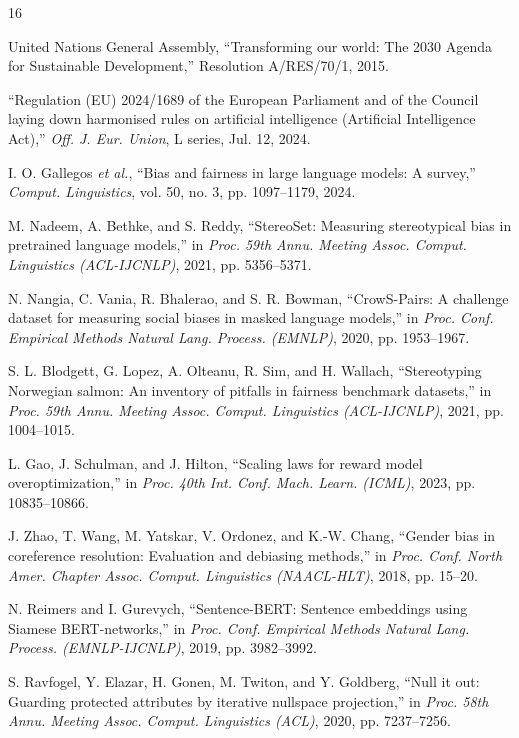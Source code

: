 \documentclass{IEEEcsmag}
\begin{document}
\begin{thebibliography}{16}

United Nations General Assembly, ``Transforming our world: The 2030 Agenda for Sustainable Development,'' Resolution A/RES/70/1, 2015.

``Regulation (EU) 2024/1689 of the European Parliament and of the Council laying down harmonised rules on artificial intelligence (Artificial Intelligence Act),'' {\it Off. J. Eur. Union}, L series, Jul. 12, 2024.

I. O. Gallegos {\it et al.}, ``Bias and fairness in large language models: A survey,'' {\it Comput. Linguistics}, vol. 50, no. 3, pp. 1097--1179, 2024.

M. Nadeem, A. Bethke, and S. Reddy, ``StereoSet: Measuring stereotypical bias in pretrained language models,'' in {\it Proc. 59th Annu. Meeting Assoc. Comput. Linguistics (ACL-IJCNLP)}, 2021, pp. 5356--5371.

N. Nangia, C. Vania, R. Bhalerao, and S. R. Bowman, ``CrowS-Pairs: A challenge dataset for measuring social biases in masked language models,'' in {\it Proc. Conf. Empirical Methods Natural Lang. Process. (EMNLP)}, 2020, pp. 1953--1967.

S. L. Blodgett, G. Lopez, A. Olteanu, R. Sim, and H. Wallach, ``Stereotyping Norwegian salmon: An inventory of pitfalls in fairness benchmark datasets,'' in {\it Proc. 59th Annu. Meeting Assoc. Comput. Linguistics (ACL-IJCNLP)}, 2021, pp. 1004--1015.

L. Gao, J. Schulman, and J. Hilton, ``Scaling laws for reward model overoptimization,'' in {\it Proc. 40th Int. Conf. Mach. Learn. (ICML)}, 2023, pp. 10835--10866.

J. Zhao, T. Wang, M. Yatskar, V. Ordonez, and K.-W. Chang, ``Gender bias in coreference resolution: Evaluation and debiasing methods,'' in {\it Proc. Conf. North Amer. Chapter Assoc. Comput. Linguistics (NAACL-HLT)}, 2018, pp. 15--20.

N. Reimers and I. Gurevych, ``Sentence-BERT: Sentence embeddings using Siamese BERT-networks,'' in {\it Proc. Conf. Empirical Methods Natural Lang. Process. (EMNLP-IJCNLP)}, 2019, pp. 3982--3992.

S. Ravfogel, Y. Elazar, H. Gonen, M. Twiton, and Y. Goldberg, ``Null it out: Guarding protected attributes by iterative nullspace projection,'' in {\it Proc. 58th Annu. Meeting Assoc. Comput. Linguistics (ACL)}, 2020, pp. 7237--7256.


\end{thebibliography}
\end{document}
